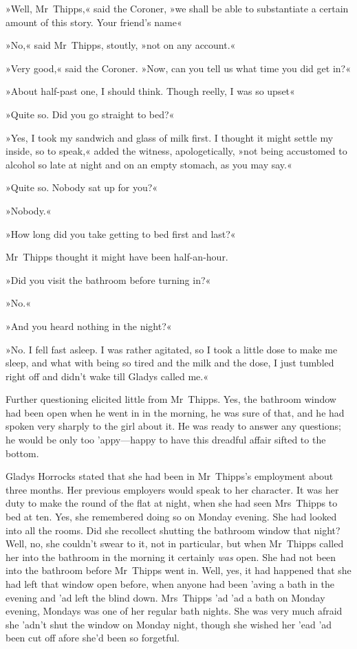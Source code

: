 »Well, Mr~Thipps,« said the Coroner, »we shall be able to substantiate a certain amount of this story. Your friend's name\longdash«

»No,« said Mr~Thipps, stoutly, »not on any account.«

»Very good,« said the Coroner. »Now, can you tell us what time you did get in?«

»About half-past one, I should think. Though reelly, I was so upset\longdash«

»Quite so. Did you go straight to bed?«

»Yes, I took my sandwich and glass of milk first. I thought it might settle my inside, so to speak,« added the witness, apologetically, »not being accustomed to alcohol so late at night and on an empty stomach, as you may say.«

»Quite so. Nobody sat up for you?«

»Nobody.«

»How long did you take getting to bed first and last?«

Mr~Thipps thought it might have been half-an-hour.

»Did you visit the bathroom before turning in?«

»No.«

»And you heard nothing in the night?«

»No. I fell fast asleep. I was rather agitated, so I took a little dose to make me sleep, and what with being so tired and the milk and the dose, I just tumbled right off and didn't wake till Gladys called me.«

Further questioning elicited little from Mr~Thipps. Yes, the bathroom window had been open when he went in in the morning, he was sure of that, and he had spoken very sharply to the girl about it. He was ready to answer any questions; he would be only too 'appy—happy to have this dreadful affair sifted to the bottom.

Gladys Horrocks stated that she had been in Mr~Thipps's employment about three months. Her previous employers would speak to her character. It was her duty to make the round of the flat at night, when she had seen Mrs~Thipps to bed at ten. Yes, she remembered doing so on Monday evening. She had looked into all the rooms. Did she recollect shutting the bathroom window that night? Well, no, she couldn't swear to it, not in particular, but when Mr~Thipps called her into the bathroom in the morning it certainly \textit{was} open. She had not been into the bathroom before Mr~Thipps went in. Well, yes, it had happened that she had left that window open before, when anyone had been 'aving a bath in the evening and 'ad left the blind down. Mrs~Thipps 'ad 'ad a bath on Monday evening, Mondays was one of her regular bath nights. She was very much afraid she 'adn't shut the window on Monday night, though she wished her 'ead 'ad been cut off afore she'd been so forgetful.

